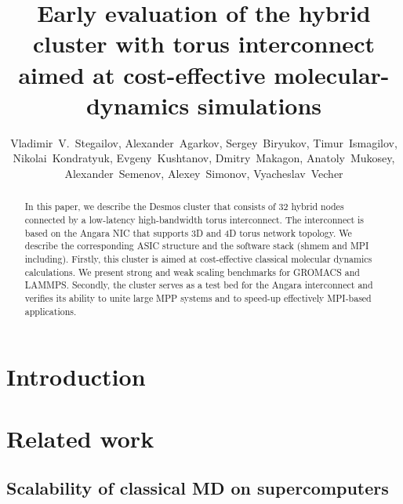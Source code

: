 \documentclass{llncs}
\begin{document}
\title{Early evaluation of the hybrid cluster with torus interconnect aimed at cost-effective molecular-dynamics simulations}

\author{%
Vladimir~V.~Stegailov,
Alexander~Agarkov,
Sergey~Biryukov,
Timur~Ismagilov,
Nikolai~Kondratyuk,
Evgeny~Kushtanov,
Dmitry~Makagon,
Anatoly~Mukosey,
Alexander~Semenov,
Alexey~Simonov,
Vyacheslav~Vecher
}
%
%

\maketitle

\begin{abstract}
In this paper, we describe the Desmos cluster that consists of 32 hybrid nodes connected by a low-latency high-bandwidth torus interconnect. The interconnect is based on the Angara NIC that supports 3D and 4D torus network topology. We describe the corresponding ASIC structure and the software stack (shmem and MPI including). Firstly, this cluster is aimed at cost-effective classical molecular dynamics calculations. We present strong and weak scaling benchmarks for GROMACS and LAMMPS. Secondly, the cluster serves as a test bed for the Angara interconnect and verifies its ability to unite large MPP systems and to speed-up effectively MPI-based applications.
\end{abstract}


\section{Introduction}


\section{Related work}

\subsection{Scalability of classical MD on supercomputers}
\end{document}
